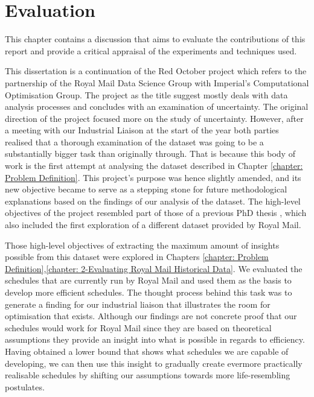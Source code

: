 \chapter{Evaluation}
\label{chapter: Evaluation}

This chapter contains a discussion that aims to evaluate the contributions of this report and provide a critical appraisal of the experiments and techniques used.

\vspace{\baselineskip}
\noindent
This dissertation is a continuation of the Red October project which refers to the partnership of the Royal Mail Data Science Group with Imperial's Computational Optimisation Group. The project as the title suggest mostly deals with data analysis processes and concludes with an examination of uncertainty. The original direction of the project focused more on the study of uncertainty. However, after a meeting with our Industrial Liaison at the start of the year both parties realised that a thorough examination of the dataset was going to be a substantially bigger task than originally through. That is because this body of work is the first attempt at analysing the dataset described in Chapter \ref{chapter: Problem Definition}. This project's purpose was hence slightly amended, and its new objective became to serve as a stepping stone for future methodological explanations based on the findings of our analysis of the dataset. The high-level objectives of the project resembled part of those of a previous PhD thesis \cite{natashapage}, which also included the first exploration of a different dataset provided by Royal Mail.

\vspace{\baselineskip}
\noindent
Those high-level objectives of extracting the maximum amount of insights possible from this dataset were explored in Chapters \ref{chapter: Problem Definition},\ref{chapter: 2-Evaluating Royal Mail Historical Data}. We evaluated the schedules that are currently run by Royal Mail and used them as the basis to develop more efficient schedules. The thought process behind this task was to generate a finding for our industrial liaison that illustrates the room for optimisation that exists. Although our findings are not concrete proof that our schedules would work for Royal Mail since they are based on theoretical assumptions they provide an insight into what is possible in regards to efficiency. Having obtained a lower bound that shows what schedules we are capable of developing, we can then use this insight to gradually create evermore practically realisable schedules by shifting our assumptions towards more life-resembling postulates. 

